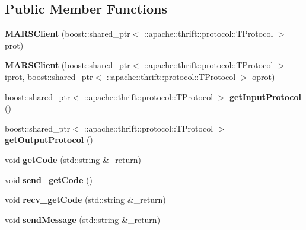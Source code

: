 \subsection*{Public Member Functions}
\begin{DoxyCompactItemize}
\item 
\mbox{\label{classMARS_1_1MARSClient_af3edff1508e0791ed2f829b9cc8756dd}} 
{\bfseries M\+A\+R\+S\+Client} (boost\+::shared\+\_\+ptr$<$ \+::apache\+::thrift\+::protocol\+::\+T\+Protocol $>$ prot)
\item 
\mbox{\label{classMARS_1_1MARSClient_acd3855458249e24c0296720d4abe3faa}} 
{\bfseries M\+A\+R\+S\+Client} (boost\+::shared\+\_\+ptr$<$ \+::apache\+::thrift\+::protocol\+::\+T\+Protocol $>$ iprot, boost\+::shared\+\_\+ptr$<$ \+::apache\+::thrift\+::protocol\+::\+T\+Protocol $>$ oprot)
\item 
\mbox{\label{classMARS_1_1MARSClient_a06872258392454e6ee5833faa07f03d2}} 
boost\+::shared\+\_\+ptr$<$ \+::apache\+::thrift\+::protocol\+::\+T\+Protocol $>$ {\bfseries get\+Input\+Protocol} ()
\item 
\mbox{\label{classMARS_1_1MARSClient_a71ef873ab97117877930a3698ae32dde}} 
boost\+::shared\+\_\+ptr$<$ \+::apache\+::thrift\+::protocol\+::\+T\+Protocol $>$ {\bfseries get\+Output\+Protocol} ()
\item 
\mbox{\label{classMARS_1_1MARSClient_ac23faa5a3a7debe8d0d3b58b2404ea9f}} 
void {\bfseries get\+Code} (std\+::string \&\+\_\+return)
\item 
\mbox{\label{classMARS_1_1MARSClient_aec3947716605a8bf032e9dc326394ff8}} 
void {\bfseries send\+\_\+get\+Code} ()
\item 
\mbox{\label{classMARS_1_1MARSClient_af274f93f5332375549a05604347a2492}} 
void {\bfseries recv\+\_\+get\+Code} (std\+::string \&\+\_\+return)
\item 
\mbox{\label{classMARS_1_1MARSClient_a00caf56cd0ea03dfb4f40344c4052332}} 
void {\bfseries send\+Message} (std\+::string \&\+\_\+return)
\item 

\end{DoxyCompactItemize}
